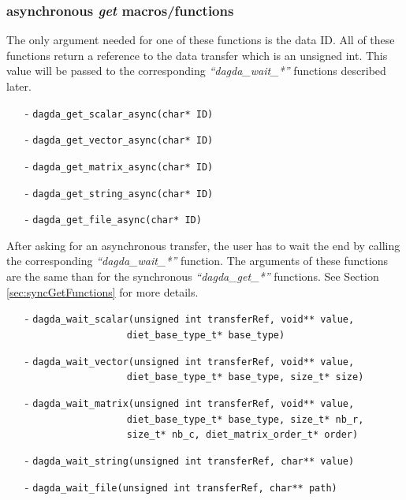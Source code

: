 \subsubsection{\dagda asynchronous \textit{get} macros/functions}
The only argument needed for one of these functions is the data ID.
All of these functions return a reference to the data transfer which
is an unsigned int. This value will be passed to the corresponding
\textit{``dagda\_wait\_*''} functions described later.
\begin{itemize}
\item[-] \verb#dagda_get_scalar_async(char* ID)#
\item[-] \verb#dagda_get_vector_async(char* ID)#
\item[-] \verb#dagda_get_matrix_async(char* ID)#
\item[-] \verb#dagda_get_string_async(char* ID)#
\item[-] \verb#dagda_get_file_async(char* ID)#
\end{itemize}

After asking for an asynchronous transfer, the user has to wait the 
end by calling the corresponding \textit{``dagda\_wait\_*''} function.
 The arguments of these functions are the same than for the synchronous
 \textit{``dagda\_get\_*''} functions. 
 See Section \ref{sec:syncGetFunctions} for more details.

\begin{itemize}
\item[-] \verb#dagda_wait_scalar(unsigned int transferRef, void** value,#\\
         \verb#                  diet_base_type_t* base_type)#
\item[-] \verb#dagda_wait_vector(unsigned int transferRef, void** value,#\\
         \verb#                  diet_base_type_t* base_type, size_t* size)#
\item[-] \verb#dagda_wait_matrix(unsigned int transferRef, void** value,#\\
         \verb#                  diet_base_type_t* base_type, size_t* nb_r,#\\
         \verb#                  size_t* nb_c, diet_matrix_order_t* order)#
\item[-] \verb#dagda_wait_string(unsigned int transferRef, char** value)#
\item[-] \verb#dagda_wait_file(unsigned int transferRef, char** path)#
\end{itemize}

